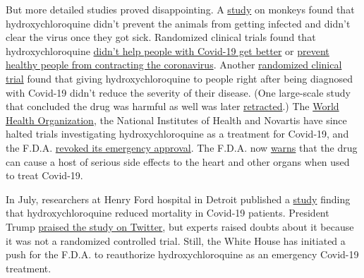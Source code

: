 But more detailed studies proved disappointing. A
\href{https://www.nature.com/articles/s41586-020-2558-4}{study} on
monkeys found that hydroxychloroquine didn't prevent the animals from
getting infected and didn't clear the virus once they got sick.
Randomized clinical trials found that hydroxychloroquine
\href{https://www.recoverytrial.net/news/statement-from-the-chief-investigators-of-the-randomised-evaluation-of-covid-19-therapy-recovery-trial-on-hydroxychloroquine-5-june-2020-no-clinical-benefit-from-use-of-hydroxychloroquine-in-hospitalised-patients-with-covid-19}{didn't
help people with Covid-19 get better} or
\href{https://www.nytimes3xbfgragh.onion/2020/06/03/health/hydroxychloroquine-coronavirus-trump.html}{prevent
healthy people from contracting the coronavirus}. Another
\href{https://www.acpjournals.org/doi/10.7326/M20-4207}{randomized
clinical trial} found that giving hydroxychloroquine to people right
after being diagnosed with Covid-19 didn't reduce the severity of their
disease. (One large-scale study that concluded the drug was harmful as
well was later
\href{https://www.nytimes3xbfgragh.onion/2020/06/04/health/coronavirus-hydroxychloroquine.html?searchResultPosition=1}{retracted}.)
The
\href{https://www.who.int/news-room/detail/04-07-2020-who-discontinues-hydroxychloroquine-and-lopinavir-ritonavir-treatment-arms-for-covid-19}{World
Health Organization}, the National Institutes of Health and Novartis
have since halted trials investigating hydroxychloroquine as a treatment
for Covid-19, and the F.D.A.
\href{https://www.nytimes3xbfgragh.onion/2020/06/15/health/fda-hydroxychloroquine-malaria.html}{revoked
its emergency approval}. The F.D.A. now
\href{https://www.fda.gov/drugs/drug-safety-and-availability/fda-cautions-against-use-hydroxychloroquine-or-chloroquine-covid-19-outside-hospital-setting-or}{warns}
that the drug can cause a host of serious side effects to the heart and
other organs when used to treat Covid-19.

In July, researchers at Henry Ford hospital in Detroit published a
\href{https://www.statnews.com/2020/07/08/a-flawed-covid-19-study-gets-the-white-houses-attention-and-the-fda-may-pay-the-price/}{study}
finding that hydroxychloroquine reduced mortality in Covid-19 patients.
President Trump
\href{https://twitter.com/realDonaldTrump/status/1280328830218051584}{praised
the study on Twitter}, but experts raised doubts about it because it was
not a randomized controlled trial. Still, the White House has initiated
a push for the F.D.A. to reauthorize hydroxychloroquine as an emergency
Covid-19 treatment.

